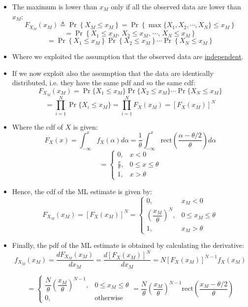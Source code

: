 \begin{itemize}
\begin{itemize}
    $$
    f_{X_M}(x_M) = \frac{dF_{X_M}(x_M)}{dx_M}, \qquad \text{where} \quad F_{X_M}(x_M) \triangleq \Pr\left\{ X_M \leq x_M \right\}
    $$
    \item The maximum is lower than \(x_M\) only if all the observed data are lower than \(x_M\):
    $$
F_{X_M}(x_M) \triangleq \Pr\left\{ X_M \leq x_M \right\} = \Pr\left\{ \max\{ X_1, X_2, \cdots, X_N \} \leq x_M \right\}
$$
$$
= \Pr\left\{ X_1 \leq x_M,\, X_2 \leq x_M,\, \cdots,\, X_N \leq x_M \right\}
$$
$$
= \Pr\left\{ X_1 \leq x_M \right\} \Pr\left\{ X_2 \leq x_M \right\} \cdots \Pr\left\{ X_N \leq x_M \right\}
$$
    \item Where we exploited the assumption that the observed data are \underline{independent}.
    \item If we now exploit also the assumption that the data are identically distributed, i.e. they have the same pdf and so the same cdf:
    $$
F_{X_M}(x_M) = \Pr\{X_1 \leq x_M\} \Pr\{X_2 \leq x_M\} \cdots \Pr\{X_N \leq x_M\}
$$
$$
= \prod_{i=1}^{N} \Pr\{X_i \leq x_M\} = \prod_{i=1}^{N} F_X(x_M) = \left[F_X(x_M)\right]^N
$$
    \item Where the cdf of \(X\) is given:
$$
F_X(x) = \int_{-\infty}^{x} f_X(\alpha) d\alpha = \frac{1}{\theta} \int_{-\infty}^{x} \text{rect}\left(\frac{\alpha - \theta/2}{\theta}\right) d\alpha
$$
$$
= 
\begin{cases}
0, & x < 0 \\
\frac{x}{\theta}, & 0 \leq x \leq \theta \\
1, & x > \theta
\end{cases}
$$


    \item Hence, the cdf of the ML estimate is given by:
    $$
    F_{X_M}(x_M) = \left[ F_X(x_M) \right]^N =
    \begin{cases}
    0, & x_M < 0 \\
    \left( \dfrac{x_M}{\theta} \right)^N, & 0 \leq x_M \leq \theta \\
    1, & x_M > \theta
    \end{cases}
    $$
    \item Finally, the pdf of the ML estimate is obtained by calculating the derivative:
    $$
    f_{X_M}(x_M) = \frac{d F_{X_M}(x_M)}{dx_M} = \frac{d \left[ F_X(x_M) \right]^N }{dx_M} = N \left[ F_X(x_M) \right]^{N-1} f_X(x_M)
    $$

    $$
    =
    \begin{cases}
    \dfrac{N}{\theta} \left(\dfrac{x_M}{\theta}\right)^{N-1}, & 0 \leq x_M \leq \theta \\
    0, & \text{otherwise}
    \end{cases}
    = \frac{N}{\theta} \left(\frac{x_M}{\theta}\right)^{N-1} \text{rect} \left( \frac{x_M - \theta/2}{\theta} \right)
    $$
    

\end{itemize}
\end{itemize}
